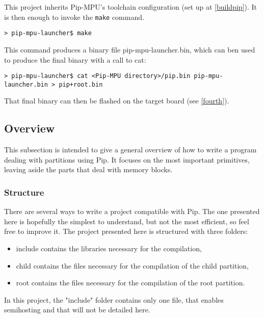 \documentclass[10pt,a4paper,titlepage]{refart}
\begin{document}

This project inherits Pip-MPU's toolchain configuration (set up at \ref{buildpip}). It is then enough to invoke the \texttt{make} 
command.

\begin{lstlisting}[style=BashStyle]
> pip-mpu-launcher$ make
\end{lstlisting}

This command produces a binary file pip-mpu-launcher{.}bin, which can ben used to produce the final binary with a call to cat:

\begin{lstlisting}[style=BashStyle]
> pip-mpu-launcher$ cat <Pip-MPU directory>/pip.bin pip-mpu-launcher.bin > pip+root.bin
\end{lstlisting}

That final binary can then be flashed on the target board (see \cref{fourth}).

\subsection{Overview}\label{subsec:overview}

This subsection is intended to give a general overview of how to write a program dealing with partitions using Pip. It focuses on 
the most important primitives, leaving aside the parts that deal with memory blocks.

\subsubsection{Structure}

There are several ways to write a project compatible with Pip. The one presented here is hopefully the simplest to understand, but 
not the most efficient, so feel free to improve it. The project presented here is structured with three folders:
\begin{itemize}
    \item include contains the libraries necessary for the compilation,
    \item child contains the files necessary for the compilation of the child partition,
    \item root contains the files necessary for the compilation of the root partition.
\end{itemize}

In this project, the "include" folder contains only one file, that enables semihosting and that will not be detailed here.
\end{document}
